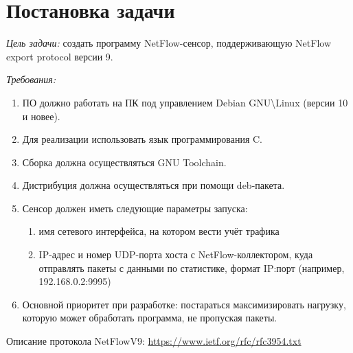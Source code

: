 \section*{Постановка задачи}

\textit{Цель задачи:} создать программу NetFlow-сенсор, поддерживающую NetFlow export protocol версии 9.

\linespace

\textit{Требования:}
\begin{enumerate}
    \item ПО должно работать на ПК под управлением Debian GNU\textbackslash Linux (версии 10 и новее).
    \item Для реализации использовать язык программирования C.
    \item Сборка должна осуществляться GNU Toolchain.
    \item Дистрибуция должна осуществляться при помощи deb-пакета.
    \item Сенсор должен иметь следующие параметры запуска:
    \begin{enumerate}[wide=\dimexpr\parindent+1.25cm, noitemsep]
        \item имя сетевого интерфейса, на котором вести учёт трафика
        \item IP-адрес и номер UDP-порта хоста с NetFlow-коллектором, куда отправлять пакеты с данными по статистике, формат IP:порт (например, 192.168.0.2:9995)
    \end{enumerate}
    \item Основной приоритет при разработке: постараться максимизировать нагрузку, которую может обработать программа, не пропуская пакеты.
\end{enumerate}

\linespace

Описание протокола NetFlowV9: \url{https://www.ietf.org/rfc/rfc3954.txt}

\linespace

